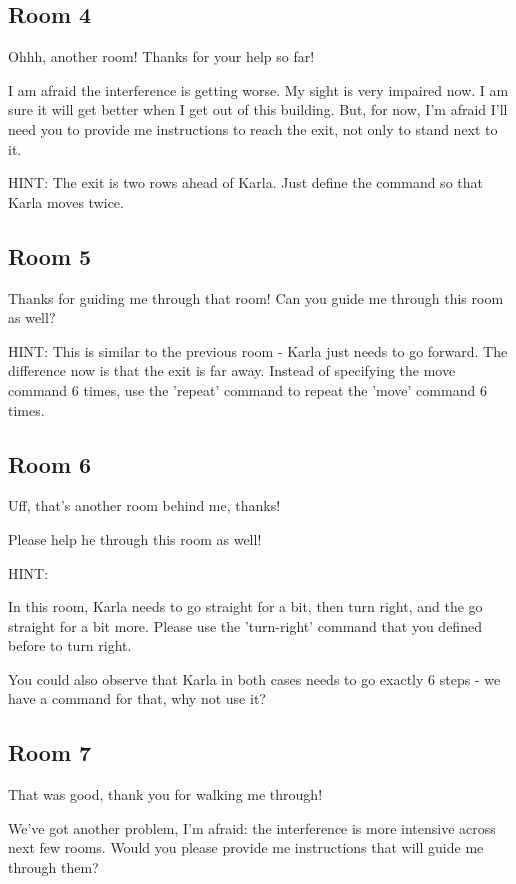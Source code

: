 \subsection{Room 4}

Ohhh, another room! Thanks for your help so far!

I am afraid the interference is getting worse. My sight is very impaired now. I am sure it will get better when I get out of this building. But, for now, I'm afraid I'll need you to provide me instructions to reach the exit, not only to stand next to it.

HINT: The exit is two rows ahead of Karla. Just define the command so that Karla moves twice.

\subsection{Room 5}

Thanks for guiding me through that room! Can you guide me through this room as well?

HINT: This is similar to the previous room - Karla just needs to go forward. The difference now is that the exit is far away. Instead of specifying the move command 6 times, use the 'repeat' command to repeat the 'move' command 6 times.

\subsection{Room 6}

Uff, that's another room behind me, thanks!

Please help he through this room as well!

HINT:

In this room, Karla needs to go straight for a bit, then turn right, and the go straight for a bit more. Please use the 'turn-right' command that you defined before to turn right.

You could also observe that Karla in both cases needs to go exactly 6 steps - we have a command for that, why not use it?

\subsection{Room 7}

That was good, thank you for walking me through!

We've got another problem, I'm afraid: the interference is more intensive across next few rooms. Would you please provide me instructions that will guide me through them?


